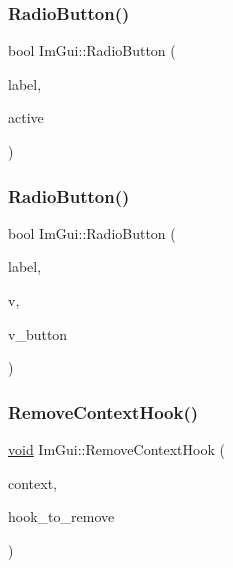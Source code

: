 \mbox{\label{namespaceImGui_a6b146763845cbad5a4144772279631bc}} 
\subsubsection{\texorpdfstring{Radio\+Button()}{RadioButton()}\hspace{0.1cm}{\footnotesize\ttfamily [1/2]}}
{\footnotesize\ttfamily bool Im\+Gui\+::\+Radio\+Button (\begin{DoxyParamCaption}\item[{const char $\ast$}]{label,  }\item[{bool}]{active }\end{DoxyParamCaption})}

\mbox{\label{namespaceImGui_a018d2b61d2f00bb7a9dd2b1f933b93a5}} 
\subsubsection{\texorpdfstring{Radio\+Button()}{RadioButton()}\hspace{0.1cm}{\footnotesize\ttfamily [2/2]}}
{\footnotesize\ttfamily bool Im\+Gui\+::\+Radio\+Button (\begin{DoxyParamCaption}\item[{const char $\ast$}]{label,  }\item[{int $\ast$}]{v,  }\item[{int}]{v\+\_\+button }\end{DoxyParamCaption})}

\mbox{\label{namespaceImGui_aacced9333540086ce71b1bdc024b6f7d}} 
\subsubsection{\texorpdfstring{Remove\+Context\+Hook()}{RemoveContextHook()}}
{\footnotesize\ttfamily \hyperlink{imgui__impl__opengl3__loader_8h_ac668e7cffd9e2e9cfee428b9b2f34fa7}{void} Im\+Gui\+::\+Remove\+Context\+Hook (\begin{DoxyParamCaption}\item[{\hyperlink{structImGuiContext}{Im\+Gui\+Context} $\ast$}]{context,  }\item[{Im\+Gui\+ID}]{hook\+\_\+to\+\_\+remove }\end{DoxyParamCaption})}

